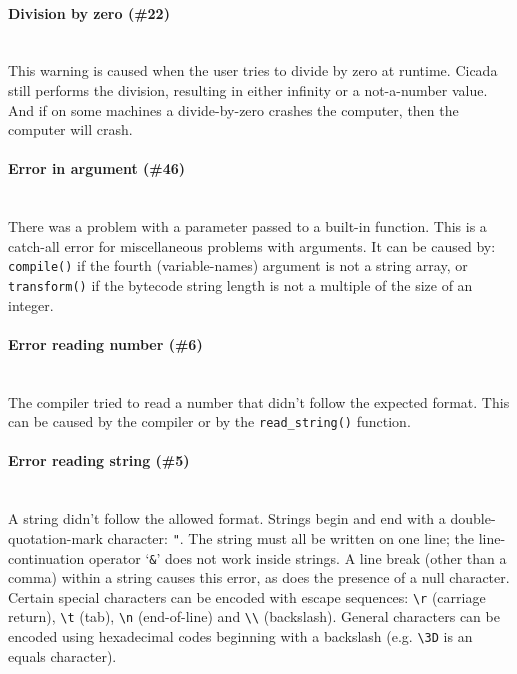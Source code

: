 \documentclass{article}
\begin{document}
\paragraph{Division by zero (\#22)\\\\}

This warning is caused when the user tries to divide by zero at runtime.  Cicada still performs the division, resulting in either infinity or a not-a-number value.  And if on some machines a divide-by-zero crashes the computer, then the computer will crash.\\




\paragraph{Error in argument (\#46)\\\\}

There was a problem with a parameter passed to a built-in function.  This is a catch-all error for miscellaneous problems with arguments.  It can be caused by:  \verb#compile()# if the fourth (variable-names) argument is not a string array, or \verb#transform()# if the bytecode string length is not a multiple of the size of an integer.\\




\paragraph{Error reading number (\#6)\\\\}

The compiler tried to read a number that didn't follow the expected format.  This can be caused by the compiler or by the \verb#read_string()# function.\\




\paragraph{Error reading string (\#5)\\\\}

A string didn't follow the allowed format.  Strings begin and end with a double-quotation-mark character:  \verb#"#.  The string must all be written on one line; the line-continuation operator `\verb#&#' does not work inside strings.  A line break (other than a comma) within a string causes this error, as does the presence of a null character.  Certain special characters can be encoded with escape sequences:  \verb#\r# (carriage return), \verb#\t# (tab), \verb#\n# (end-of-line) and \verb#\\# (backslash).  General characters can be encoded using hexadecimal codes beginning with a backslash (e.g. \verb#\3D# is an equals character).\\
\end{document}
